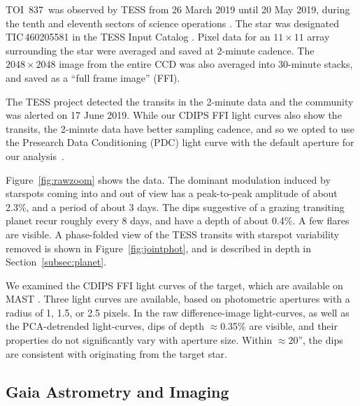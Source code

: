 \documentclass[12pt,twocolumn,tighten]{aastex63}
\newcommand{\tn}{TOI~837} %
\begin{document}
\tn\ was observed by TESS from 26 March 2019 until 20 May 2019, during
the tenth and eleventh sectors of science operations
\citep{ricker_transiting_2015}.  The star was designated
TIC\,460205581 in the TESS Input Catalog
\citep{stassun_TIC_2018,stassun_TIC8_2019}.  Pixel data for an
$11\times11$ array surrounding the star were averaged and saved at
2-minute cadence.  The $2048\times2048$ image from the entire CCD was
also averaged into 30-minute stacks, and saved as a ``full frame
image'' (FFI).

The TESS project detected the transits in the 2-minute data and the
community was alerted on 17 June 2019.  While our CDIPS FFI light
curves also show the transits, the 2-minute data have better sampling
cadence, and so we opted to use the Presearch Data Conditioning (PDC)
light curve with the default aperture for our
analysis~\citep{smith_kepler_2012,stumpe_multiscale_2014,jenkins_tess_2016,smith_finding_2016}.

Figure~\ref{fig:rawzoom} shows the data.  The dominant modulation
induced by starspots coming into and out of view has a peak-to-peak
amplitude of about 2.3\%, and a period of about 3 days.  The dips
suggestive of a grazing transiting planet recur roughly every 8 days,
and have a depth of about 0.4\%.  A few flares are visible.  A
phase-folded view of the TESS transits with starspot variability
removed is shown in Figure~\ref{fig:jointphot}, and is described in
depth in Section~\ref{subsec:planet}.


We examined the CDIPS FFI light curves of the target, which are
available on MAST \citep{bouma_cluster_2019}. Three light curves are
available, based on photometric apertures with a radius of 1, 1.5, or
2.5 pixels.  In the raw difference-image light-curves, as well as the
PCA-detrended light-curves, dips of depth $\approx$0.35\% are visible,
and their properties do not significantly vary with aperture size.
Within $\approx20$'', the dips are consistent with originating from
the target star.



\subsection{Gaia Astrometry and Imaging}
\label{subsec:gaia}
\end{document}
